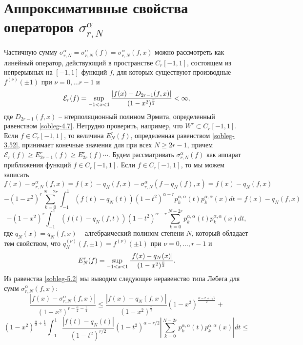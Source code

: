 \section{Аппроксимативные свойства операторов $\sigma_{r,N}^\alpha$}

   Частичную сумму $\sigma_{r,N}^\alpha=\sigma_{r,N}^\alpha(f)=\sigma_{r,N}^\alpha(f,x)$ можно рассмотреть как линейный оператор, действующий в пространстве  $C_r[-1,1]$, состоящем из непрерывных на $[-1,1]$ функций $f$, для которых существуют производные $f^{(\nu)}(\pm1)$ при $\nu=0,\ldots r-1$ и   \begin{equation}\label{sobleg-5.1}
 \mathcal{ E}_r(f)=\sup_{-1<x<1}{|f(x)-D_{2r-1}(f,x)|\over (1-x^2)^\frac{r}{2}}<\infty,
\end{equation}
где $D_{2r-1}(f,x)$ -- нтерполяционный полином Эрмита, определенный равенством \eqref{sobleg-4.7}.
Нетрудно проверить, например, что $W^r\subset C_r[-1,1]$. Если $f\in C_r[-1,1]$, то  величина $E_N^r(f)$, определенная равенством \eqref{sobleg-3.52}, принимает конечные значения для при всех $N\ge 2r-1$, причем $\mathcal{ E}_r(f)\ge E_{2r-1}^r(f)\ge E_{2r}^r(f)\cdots$. Будем рассматривать $\sigma_{r,N}^\alpha(f)$ как аппарат приближения функций $f\in C_r[-1,1]$.
Если $f\in C_r[-1,1]$, то мы можем записать
$$
f(x)-\sigma_{r,N}^\alpha(f,x)=
 f(x)-q_N(f,x)-\sigma_{r,N}^\alpha(f-q_N(f),x)=f(x)-q_N(f,x)
$$
$$
-(1-x^2)^r \sum_{k=0}^{N-2r} \int_{-1}^1(f(t)-q_N(t))(1-t^2)^{\alpha-r} p_{k}^{\alpha,\alpha}(t)p_{k}^{\alpha,\alpha}(x)dt=f(x)-q_N(f,x)
$$
\begin{equation}\label{sobleg-5.2}
-(1-x^2)^r\int_{-1}^1(f(t)-q_N(f,t))(1-t^2)^{\alpha-r}\sum_{k=0}^{N-2r}  p_{k}^{\alpha,\alpha}(t)p_{k}^{\alpha,\alpha}(x)dt,
\end{equation}
где $q_N(x)=q_N(f,x)$ -- алгебраический полином  степени $N$, который обладает тем свойством, что $q^{(\nu)}_N(f,\pm1)=f^{(\nu)}(\pm1)$ при $\nu=0,\ldots,r-1$  и
\begin{equation}\label{sobleg-5.3}
E_N^r(f)=\sup_{-1<x<1}{|f(x)-q_N(x)|\over (1-x^2)^\frac{r}{2}}.
\end{equation}
 Из равенства \eqref{sobleg-5.2} мы выводим следующее неравенство типа Лебега для сумм $\sigma_{r,N}^\alpha(f,x)$:
$$
\frac{|f(x)-\sigma_{r,N}^\alpha(f,x)|}{(1-x^2)^{r-\frac{\alpha}{2}-\frac14}}\le \frac{|f(x)-q_N(f,x)|}{(1-x^2)^\frac{r}{2}}(1-x^2)^\frac{\alpha-r+1/2}{2}+
$$
$$
(1-x^2)^{\frac{\alpha}{2}+\frac14}  \int_{-1}^1\frac{|f(t)-q_N(t)|}{(1-t^2)^{r/2}}(1-t^2)^{\alpha-r/2} \left|\sum_{k=0}^{N-2r}p_{k}^{\alpha,\alpha}(t)p_{k}^{\alpha,\alpha}(x)\right|dt\le
$$
